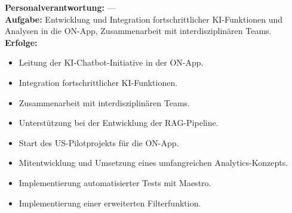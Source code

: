 \documentclass[10pt,a4paper,normalphoto]{altacv}
\begin{document}

\vspace{2em}

\textbf{Personalverantwortung:} —\\
\textbf{Aufgabe:} Entwicklung und Integration fortschrittlicher KI-Funktionen und Analysen in die ON-App, Zusammenarbeit mit interdisziplinären Teams.\\
\textbf{Erfolge:}
\begin{itemize}
    \item Leitung der KI-Chatbot-Initiative in der ON-App.
    \item Integration fortschrittlicher KI-Funktionen.
    \item Zusammenarbeit mit interdisziplinären Teams.
    \item Unterstützung bei der Entwicklung der RAG-Pipeline.
    \item Start des US-Pilotprojekts für die ON-App.
    \item Mitentwicklung und Umsetzung eines umfangreichen Analytics-Konzepts.
    \item Implementierung automatisierter Tests mit Maestro.
    \item Implementierung einer erweiterten Filterfunktion.
\end{itemize}

\vspace{1em}

\end{document}
